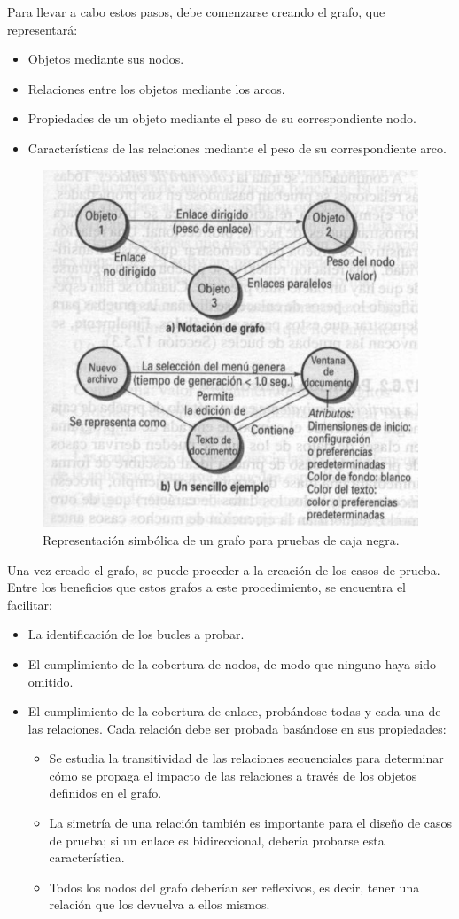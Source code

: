 Para llevar a cabo estos pasos, debe comenzarse creando el grafo, que representará:

\begin{itemize}
    \item Objetos mediante sus nodos.
    \item Relaciones entre los objetos mediante los arcos.
    \item Propiedades de un objeto mediante el peso de su correspondiente nodo.
    \item Características de las relaciones mediante el peso de su correspondiente arco.
\end{itemize}

\begin{figure}[H]
    \centering
    \includegraphics[width=0.5\linewidth]{Resources/Tema6/Ejemplo_Grafo.png}
    \caption{Representación simbólica de un grafo para pruebas de caja negra.}
    \label{fig:estrategiasPruebas}
\end{figure}

Una vez creado el grafo, se puede proceder a la creación de los casos de prueba. Entre los beneficios que estos grafos a este procedimiento, se encuentra el facilitar:

\begin{itemize}
    \item La identificación de los bucles a probar.
    \item El cumplimiento de la cobertura de nodos, de modo que ninguno haya sido omitido.
    \item El cumplimiento de la cobertura de enlace, probándose todas y cada una de las relaciones. Cada relación debe ser probada basándose en sus propiedades:
    \begin{itemize}
        \item Se estudia la transitividad de las relaciones secuenciales para determinar cómo se propaga el impacto de las relaciones a través de los objetos definidos en el grafo.
        \item La simetría de una relación también es importante para el diseño de casos de prueba; si un enlace es bidireccional, debería probarse esta característica.
        \item Todos los nodos del grafo deberían ser reflexivos, es decir, tener una relación que los devuelva a ellos mismos. %
    \end{itemize}
\end{itemize}

